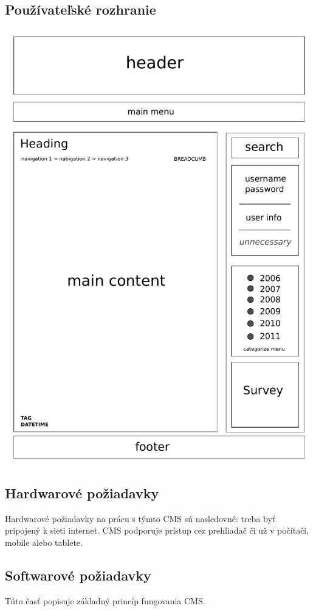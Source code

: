 \documentclass[a4paper,titlepage,11pt]{article}
\begin{document}
\subsection{Používateľské rozhranie}
\includegraphics[width=\textwidth]{user_interface.pdf}

\subsection{Hardwarové požiadavky}
Hardwarové požiadavky na prácu s týmto CMS sú nasledovné: treba byť pripojený k sieti internet. 
CMS podporuje prístup cez prehliadač či už v počítači, mobile alebo tablete. 

\subsection{Softwarové požiadavky}
Túto časť popisuje základný princíp fungovania CMS. 
\end{document}
